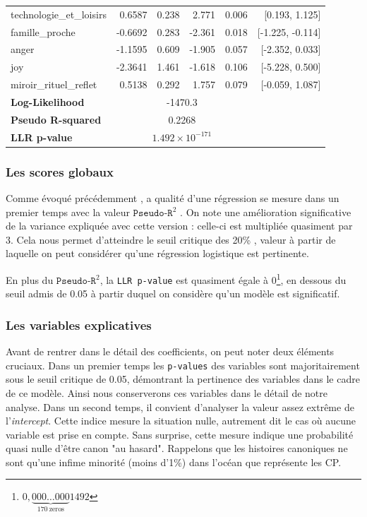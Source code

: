 \documentclass[12pt,a4paper,oneside,titlepage]{book} %
\begin{document}
\begin{table}[htbp]
\begin{tabular}{lrrrrr}
technologie\_et\_loisirs     & 0.6587  & 0.238  & 2.771  & 0.006 & [0.193, 1.125] \\
famille\_proche              & -0.6692 & 0.283  & -2.361 & 0.018 & [-1.225, -0.114] \\
anger                        & -1.1595 & 0.609  & -1.905 & 0.057 & [-2.352, 0.033] \\
joy                          & -2.3641 & 1.461  & -1.618 & 0.106 & [-5.228, 0.500] \\
miroir\_rituel\_reflet       & 0.5138  & 0.292  & 1.757  & 0.079 & [-0.059, 1.087] \\
\midrule
\textbf{Log-Likelihood}      & \multicolumn{4}{c}{-1470.3} \\
\textbf{Pseudo R-squared}    & \multicolumn{4}{c}{0.2268} \\
\textbf{LLR p-value}         & \multicolumn{4}{c}{$1.492 \times 10^{-171}$} \\
\bottomrule
\end{tabular}
\label{table:logit_année_2}
\end{table}

\subsubsection{Les scores globaux}

Comme évoqué précédemment , a qualité d'une régression se mesure dans un premier temps avec la valeur $\texttt{Pseudo-R}^2$ . On note une amélioration significative de la variance expliquée avec cette version : celle-ci est multipliée quasiment par 3. 
Cela nous permet d'atteindre le seuil critique des 20\% , valeur à partir de laquelle on peut considérer qu'une régression logistique est pertinente. 

En plus du $\texttt{Pseudo-R}^2$, la \texttt{LLR p-value} est quasiment égale à 0\footnote{$0,\underbrace{000\ldots000}_{170\ \text{zeros}}1492$
}, en dessous du seuil admis de 0.05 à partir duquel on considère qu'un modèle est significatif.

\subsubsection{Les variables explicatives}

Avant de rentrer dans le détail des coefficients, on peut noter deux éléments cruciaux.
Dans un premier temps les \texttt{p-values} des variables sont majoritairement sous le seuil critique de 0.05, démontrant la pertinence des variables dans le cadre de ce modèle. Ainsi nous conserverons ces variables dans le détail de notre analyse. 
Dans un second temps, il convient d'analyser la valeur assez extrême de l'\textit{intercept}. Cette indice mesure la situation nulle, autrement dit le cas où aucune variable est prise en compte. Sans surprise, cette mesure indique une probabilité quasi nulle d'être canon "au hasard". Rappelons que les histoires canoniques ne sont qu'une infime minorité (moins d'1\%) dans l'océan que représente les CP.
\end{document}
